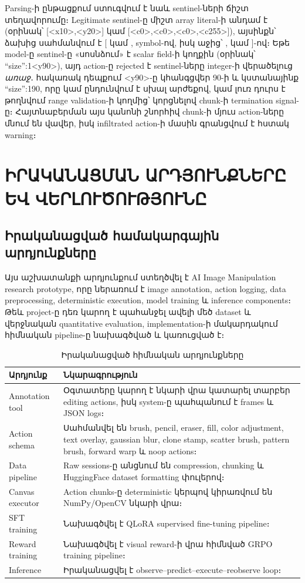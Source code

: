 \documentclass[12pt,a4paper]{report}
\newcommand{\Eng}[1]{\textenglish{#1}}
\begin{document}
Parsing-ի ընթացքում ստուգվում է նաև sentinel-ների ճիշտ տեղավորումը։ Legitimate sentinel-ը միշտ array literal-ի անդամ է (օրինակ՝ \Eng{[<x10>,<y20>]} կամ \Eng{[<c0>,<c0>,<c0>,<c255>]}), այսինքն՝ ձախից սահմանվում է \Eng{[} կամ \Eng{,} symbol-ով, իսկ աջից՝ \Eng{,} կամ \Eng{]}-ով։ Եթե model-ը sentinel-ը «սոսնձում» է scalar field-ի կողքին (օրինակ՝ \Eng{``size'':1<y90>}), այդ action-ը rejected է sentinel-ները integer-ի վերածելուց \textit{առաջ}․ հակառակ դեպքում \Eng{<y90>}-ը կհանգցվեր \Eng{90}-ի և կստանայինք \Eng{``size'':190}, որը կամ ընդունվում է սխալ արժեքով, կամ լուռ դուրս է թողնվում range validation-ի կողմից՝ կորցնելով chunk-ի termination signal-ը։ Հայտնաբերման այս կանոնի շնորհիվ chunk-ի մյուս action-ները մնում են վավեր, իսկ infiltrated action-ի մասին գրանցվում է հստակ warning։

\chapter{ԻՐԱԿԱՆԱՑՄԱՆ ԱՐԴՅՈՒՆՔՆԵՐԸ ԵՎ ՎԵՐԼՈՒԾՈՒԹՅՈՒՆԸ}

\section{Իրականացված համակարգային արդյունքները}

Այս աշխատանքի արդյունքում ստեղծվել է \Eng{AI Image Manipulation} research prototype, որը ներառում է image annotation, action logging, data preprocessing, deterministic execution, model training և inference components։ Թեև project-ը դեռ կարող է պահանջել ավելի մեծ dataset և վերջնական quantitative evaluation, implementation-ի մակարդակում հիմնական pipeline-ը նախագծված և կառուցված է։

\begin{table}[H]
\caption{Իրականացված հիմնական արդյունքները}
\centering
\begin{tabularx}{\textwidth}{p{5cm}X}
\toprule
\textbf{Արդյունք} & \textbf{Նկարագրություն} \\
\midrule
\Eng{Annotation tool} & Օգտատերը կարող է նկարի վրա կատարել տարբեր editing actions, իսկ system-ը պահպանում է frames և JSON logs։ \\
\Eng{Action schema} & Սահմանվել են brush, pencil, eraser, fill, color adjustment, text overlay, gaussian blur, clone stamp, scatter brush, pattern brush, forward warp և noop actions։ \\
\Eng{Data pipeline} & Raw sessions-ը անցնում են compression, chunking և HuggingFace dataset formatting փուլերով։ \\
\Eng{Canvas executor} & Action chunks-ը deterministic կերպով կիրառվում են NumPy/OpenCV նկարի վրա։ \\
\Eng{SFT training} & Նախագծվել է QLoRA supervised fine-tuning pipeline։ \\
\Eng{Reward training} & Նախագծվել է visual reward-ի վրա հիմնված GRPO training pipeline։ \\
\Eng{Inference} & Իրականացվել է observe--predict--execute--reobserve loop։ \\
\bottomrule
\end{tabularx}
\end{table}
\end{document}
